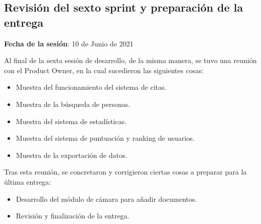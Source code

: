 \subsection{Revisión del sexto sprint y preparación de la entrega}

\textbf{Fecha de la sesión}: 10 de Junio de 2021

Al final de la sexta sesión de desarrollo, de la misma manera, se tuvo una reunión con el Product Owner, en la cual sucedieron las siguientes cosas: 

\begin{itemize}
    \item Muestra del funcionamiento del sistema de citas.
    \item Muestra de la búsqueda de personas.
    \item Muestra del sistema de estadísticas.
    \item Muestra del sistema de puntuación y ranking de usuarios.
    \item Muestra de la exportación de datos.
\end{itemize}

Tras esta reunión, se concretaron y corrigieron ciertas cosas a preparar para la última entrega:

\begin{itemize}
    \item Desarrollo del módulo de cámara para añadir documentos.
    \item Revisión y finalización de la entrega.
\end{itemize}